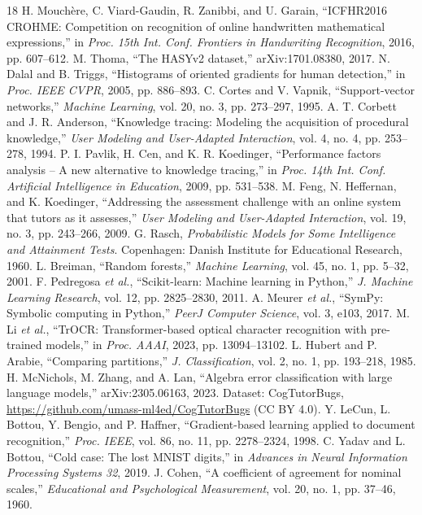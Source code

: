 \documentclass[conference]{IEEEtran}
\begin{document}
\begin{thebibliography}{18}
 H. Mouch\`ere, C. Viard-Gaudin, R. Zanibbi, and U. Garain, ``ICFHR2016 CROHME: Competition on recognition of online handwritten mathematical expressions,'' in \textit{Proc. 15th Int. Conf. Frontiers in Handwriting Recognition}, 2016, pp. 607--612.
 M. Thoma, ``The HASYv2 dataset,'' arXiv:1701.08380, 2017.
 N. Dalal and B. Triggs, ``Histograms of oriented gradients for human detection,'' in \textit{Proc. IEEE CVPR}, 2005, pp. 886--893.
 C. Cortes and V. Vapnik, ``Support-vector networks,'' \textit{Machine Learning}, vol. 20, no. 3, pp. 273--297, 1995.
 A. T. Corbett and J. R. Anderson, ``Knowledge tracing: Modeling the acquisition of procedural knowledge,'' \textit{User Modeling and User-Adapted Interaction}, vol. 4, no. 4, pp. 253--278, 1994.
 P. I. Pavlik, H. Cen, and K. R. Koedinger, ``Performance factors analysis -- A new alternative to knowledge tracing,'' in \textit{Proc. 14th Int. Conf. Artificial Intelligence in Education}, 2009, pp. 531--538.
 M. Feng, N. Heffernan, and K. Koedinger, ``Addressing the assessment challenge with an online system that tutors as it assesses,'' \textit{User Modeling and User-Adapted Interaction}, vol. 19, no. 3, pp. 243--266, 2009.
 G. Rasch, \textit{Probabilistic Models for Some Intelligence and Attainment Tests}. Copenhagen: Danish Institute for Educational Research, 1960.
 L. Breiman, ``Random forests,'' \textit{Machine Learning}, vol. 45, no. 1, pp. 5--32, 2001.
 F. Pedregosa \textit{et al.}, ``Scikit-learn: Machine learning in Python,'' \textit{J. Machine Learning Research}, vol. 12, pp. 2825--2830, 2011.
 A. Meurer \textit{et al.}, ``SymPy: Symbolic computing in Python,'' \textit{PeerJ Computer Science}, vol. 3, e103, 2017.
 M. Li \textit{et al.}, ``TrOCR: Transformer-based optical character recognition with pre-trained models,'' in \textit{Proc. AAAI}, 2023, pp. 13094--13102.
 L. Hubert and P. Arabie, ``Comparing partitions,'' \textit{J. Classification}, vol. 2, no. 1, pp. 193--218, 1985.
 H. McNichols, M. Zhang, and A. Lan, ``Algebra error classification with large language models,'' arXiv:2305.06163, 2023. Dataset: CogTutorBugs, \url{https://github.com/umass-ml4ed/CogTutorBugs} (CC BY 4.0).
 Y. LeCun, L. Bottou, Y. Bengio, and P. Haffner, ``Gradient-based learning applied to document recognition,'' \textit{Proc. IEEE}, vol. 86, no. 11, pp. 2278--2324, 1998.
 C. Yadav and L. Bottou, ``Cold case: The lost MNIST digits,'' in \textit{Advances in Neural Information Processing Systems 32}, 2019.
 J. Cohen, ``A coefficient of agreement for nominal scales,'' \textit{Educational and Psychological Measurement}, vol. 20, no. 1, pp. 37--46, 1960.
\end{thebibliography}
\end{document}
